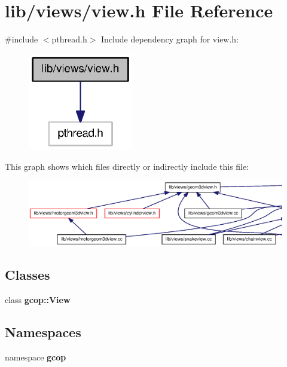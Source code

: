 \section{lib/views/view.h \-File \-Reference}
\label{view_8h}
{\ttfamily \#include $<$pthread.\-h$>$}\*
\-Include dependency graph for view.\-h\-:\nopagebreak
\begin{figure}[H]
\begin{center}
\leavevmode
\includegraphics[width=130pt]{view_8h__incl}
\end{center}
\end{figure}
\-This graph shows which files directly or indirectly include this file\-:\nopagebreak
\begin{figure}[H]
\begin{center}
\leavevmode
\includegraphics[width=350pt]{view_8h__dep__incl}
\end{center}
\end{figure}
\subsection*{\-Classes}
\begin{DoxyCompactItemize}
\item 
class {\bf gcop\-::\-View}
\end{DoxyCompactItemize}
\subsection*{\-Namespaces}
\begin{DoxyCompactItemize}
\item 
namespace {\bf gcop}
\end{DoxyCompactItemize}
